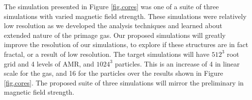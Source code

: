 The simulation presented in Figure \ref{fig.cores} was one of a suite of three
simulations with varied magnetic field strength.  These simulations were
relatively low resolution as we developed the analysis techniques and learned
about extended nature of the primage gas.
Our proposed simulations will greatly improve the resolution of our simulations,
to explore if these structures are in fact fractal, or a result of low
resolution. The target simulations will have $512^3$ root grid and 4 levels of
AMR, and $1024^3$ particles.  This is an increase of 4 in linear scale for the
gas, and 16 for the particles over the results shown in Figure \ref{fig.cores}.
The proposed suite of three simulations will mirror the preliminary in magnetic
field strength.  



